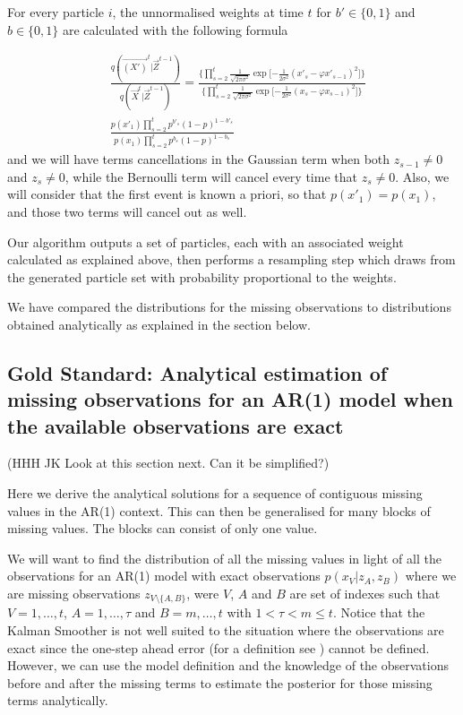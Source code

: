 For every particle $i$, the unnormalised weights at time $t$ for $b' \in \{0,1\}$ and $b \in \{0,1\}$ are calculated with the following formula

\begin{align} \label{eq:2}
    &\frac{q(\vec{(X')}^{t} | \vec{Z}^{t-1}) }{q(\vec{X}^{t} | \vec{Z}^{t-1})} =
    \frac{\bigg \{ \prod_{s=2}^{t}  \frac{1}{\sqrt{2 \pi \sigma^{2}}} \exp \bigg [ { - \frac{1}{2 \sigma^{2}} }  (x'_s - \varphi x'_{s-1})^{2} \bigg ] \bigg \} }{\bigg \{ \prod_{s=2}^{t}  \frac{1}{\sqrt{2 \pi \sigma^{2}}} \exp \bigg [ { - \frac{1}{2 \sigma^{2}} }  (x_s - \varphi x_{s-1})^{2} \bigg ] \bigg \} } \nonumber \\
    &\frac{p(x'_{1}) \prod_{s=2}^{t} p^{b'_s} (1 - p)^{1-b'_s}  }{ p(x_{1}) \prod_{s=2}^{t} p^{b_s} (1 - p)^{1-b_s} }
\end{align}
and we will have terms cancellations in the Gaussian term when both $z_{s-1} \neq 0$ and $z_s \neq 0$, while the Bernoulli term will cancel every time that $z_s \neq 0$. Also, we will consider that the first event is known a priori, so that $p(x'_1)=p(x_1)$, and those two terms will cancel out as well.

Our algorithm outputs a set of particles, each with an associated weight calculated as explained above, then performs a resampling step which draws from the generated particle set with probability proportional to the weights.

We have compared the distributions for the missing observations to distributions obtained analytically as explained in the section below.

\subsection{Gold Standard: Analytical estimation of missing observations for an AR(1) model when the available observations are exact}
\label{sec:6}

{\color{red} (HHH JK Look at this section next. Can it be simplified?)}

Here we derive the analytical solutions for a sequence of contiguous missing values in the AR(1) context. This can then be generalised for many blocks of missing values. The blocks can consist of only one value.

We will want to find the distribution of all the missing values in light of all the observations for an AR(1) model with exact observations $p(x_V | z_A, z_B)$ where we are missing observations $z_{V \setminus \{A,B\} }$, were $V$, $A$ and $B$ are set of indexes such that $V = 1, \dots, t$, $A = 1, \dots, \tau$ and $B = m, \dots, t$ with $1 < \tau < m \leq t$.
Notice that the Kalman Smoother is not well suited to the situation where the observations are exact since the one-step ahead error {\color{blue}(for a definition see \cite{Young})} cannot be defined. However, we can use the model definition and the knowledge of the observations before and after the missing terms to estimate the posterior for those missing terms analytically.

